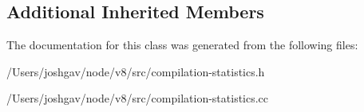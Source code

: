 \subsection*{Additional Inherited Members}


The documentation for this class was generated from the following files\+:\begin{DoxyCompactItemize}
\item 
/\+Users/joshgav/node/v8/src/compilation-\/statistics.\+h\item 
/\+Users/joshgav/node/v8/src/compilation-\/statistics.\+cc\end{DoxyCompactItemize}
